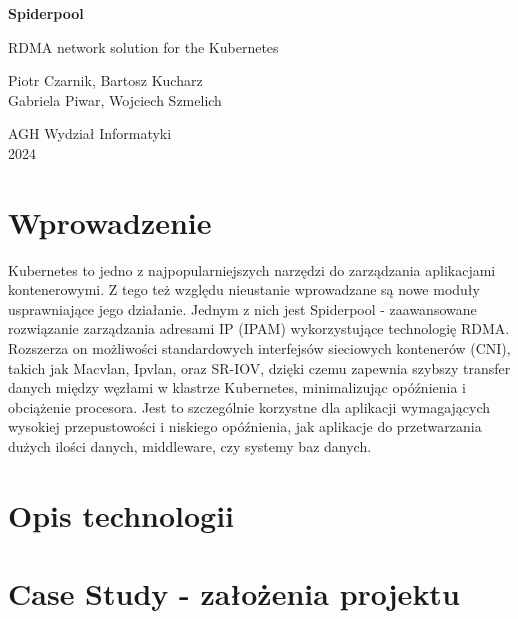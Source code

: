\documentclass[onecolumn,12pt]{article}
\begin{document}
\begin{titlepage}
\begin{center}
\vspace*{2.5cm}
\Huge
\textbf{Spiderpool}
            
\vspace{0.5cm}
\LARGE
RDMA network solution for the Kubernetes
            
\vspace{1.5cm}

\large
Piotr Czarnik, Bartosz Kucharz
\\Gabriela Piwar, Wojciech Szmelich
              
\vspace{0.8cm}          
\Large
AGH Wydział Informatyki\\
2024    
\end{center}
\end{titlepage}

\tableofcontents
\thispagestyle{empty}
\newpage

\section{Wprowadzenie}
Kubernetes to jedno z najpopularniejszych narzędzi do zarządzania aplikacjami kontenerowymi. 
Z tego też względu nieustanie wprowadzane są nowe moduły usprawniające jego działanie. 
Jednym z nich jest Spiderpool - zaawansowane rozwiązanie zarządzania adresami IP (IPAM) wykorzystujące technologię RDMA.
Rozszerza on możliwości standardowych interfejsów sieciowych kontenerów (CNI), takich jak Macvlan, Ipvlan, oraz SR-IOV, 
dzięki czemu zapewnia  szybszy transfer danych między węzłami w klastrze Kubernetes, minimalizując opóźnienia i obciążenie procesora. 
Jest to szczególnie korzystne dla aplikacji wymagających wysokiej przepustowości i niskiego opóźnienia, 
jak aplikacje do przetwarzania dużych ilości danych, middleware, czy systemy baz danych.

\section{Opis technologii}

\section{Case Study - założenia projektu}
\end{document}
